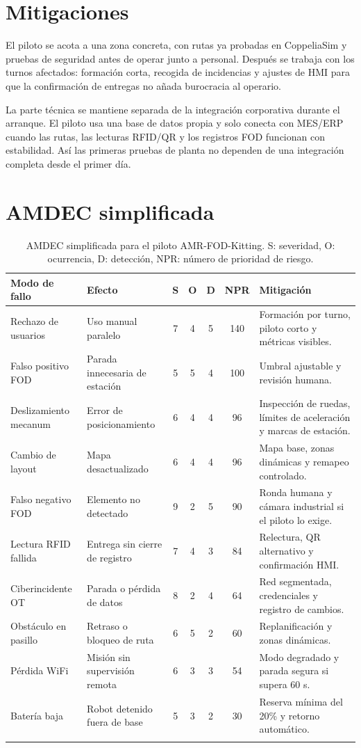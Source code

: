 \section{Mitigaciones}

El piloto se acota a una zona concreta, con rutas ya probadas en CoppeliaSim y pruebas de seguridad antes de operar junto a personal. Después se trabaja con los turnos afectados: formación corta, recogida de incidencias y ajustes de HMI para que la confirmación de entregas no añada burocracia al operario.

La parte técnica se mantiene separada de la integración corporativa durante el arranque. El piloto usa una base de datos propia y solo conecta con MES/ERP cuando las rutas, las lecturas RFID/QR y los registros FOD funcionan con estabilidad. Así las primeras pruebas de planta no dependen de una integración completa desde el primer día.

\section{AMDEC simplificada}

\begin{longtable}{P{0.20\textwidth}P{0.24\textwidth}c c c c P{0.22\textwidth}}
\toprule
Modo de fallo & Efecto & S & O & D & NPR & Mitigación\\
\midrule
\endhead
Rechazo de usuarios & Uso manual paralelo & 7 & 4 & 5 & 140 & Formación por turno, piloto corto y métricas visibles.\\
Falso positivo FOD & Parada innecesaria de estación & 5 & 5 & 4 & 100 & Umbral ajustable y revisión humana.\\
Deslizamiento mecanum & Error de posicionamiento & 6 & 4 & 4 & 96 & Inspección de ruedas, límites de aceleración y marcas de estación.\\
Cambio de layout & Mapa desactualizado & 6 & 4 & 4 & 96 & Mapa base, zonas dinámicas y remapeo controlado.\\
Falso negativo FOD & Elemento no detectado & 9 & 2 & 5 & 90 & Ronda humana y cámara industrial si el piloto lo exige.\\
Lectura RFID fallida & Entrega sin cierre de registro & 7 & 4 & 3 & 84 & Relectura, QR alternativo y confirmación HMI.\\
Ciberincidente OT & Parada o pérdida de datos & 8 & 2 & 4 & 64 & Red segmentada, credenciales y registro de cambios.\\
Obstáculo en pasillo & Retraso o bloqueo de ruta & 6 & 5 & 2 & 60 & Replanificación y zonas dinámicas.\\
Pérdida WiFi & Misión sin supervisión remota & 6 & 3 & 3 & 54 & Modo degradado y parada segura si supera 60 s.\\
Batería baja & Robot detenido fuera de base & 5 & 3 & 2 & 30 & Reserva mínima del 20\% y retorno automático.\\
\bottomrule
\caption{AMDEC simplificada para el piloto AMR-FOD-Kitting. S: severidad, O: ocurrencia, D: detección, NPR: número de prioridad de riesgo.}
\label{tab:amdec}
\end{longtable}


